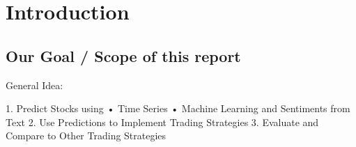 \chapter{Introduction}\label{ch:Optimization}
\section{Our Goal / Scope of this report}


General Idea: 

1. Predict Stocks using
• Time Series
• Machine Learning and Sentiments from Text
2. Use Predictions to Implement Trading Strategies
3. Evaluate and Compare to Other Trading Strategies
